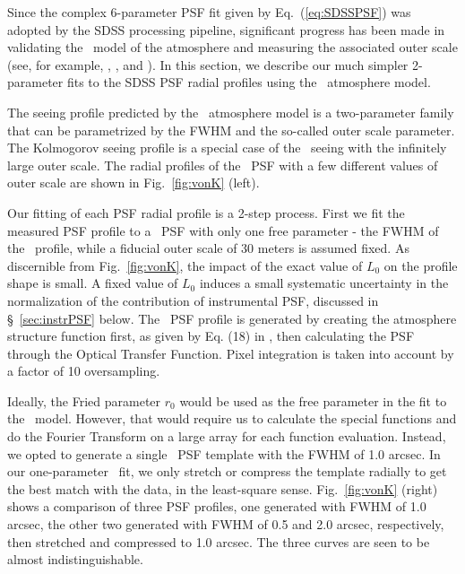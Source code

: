 

Since the complex 6-parameter PSF fit given by Eq.~(\ref{eq:SDSSPSF}) was adopted by 
the SDSS processing pipeline, significant progress has been made in validating the 
\vk~model of the atmosphere and measuring the associated outer
scale (see, for example, \citealt{Tokovinin2002}, \citealt{Boccas2004}, and \citealt{MartinezMessenger}).
In this section, we describe our much simpler 2-parameter fits to the SDSS PSF
radial profiles using the \vk~atmosphere model.

The seeing profile predicted by the \vk~atmosphere model is a two-parameter
family that can be parametrized by the FWHM and the so-called outer scale
parameter. The Kolmogorov seeing profile is a special case of the 
\vk~seeing with the infinitely large outer scale. The radial profiles of the 
\vk~PSF with a few different values of outer scale are shown in Fig.~\ref{fig:vonK} (left). 


Our fitting of each PSF radial profile is a 2-step process. First we fit the
measured PSF profile to a \vk~PSF with only one free parameter -
the FWHM of the \vk~profile, while a fiducial outer scale of 30 meters
is assumed fixed. As discernible from Fig.~\ref{fig:vonK}, the impact of the exact
value of $L_0$ on the profile shape is small. A fixed value of $L_0$ induces a small 
systematic uncertainty in the normalization of the contribution of instrumental PSF, 
discussed in \S~\ref{sec:instrPSF}  below. The \vk~PSF profile is generated by creating 
the atmosphere structure function first, as given by Eq. (18) in \cite{Tokovinin2002},
then calculating the PSF through the Optical Transfer Function. 
Pixel integration is taken into account by a factor of 10 oversampling.

Ideally, the Fried parameter $r_0$ would be used as the free
parameter in the fit to the \vk~model. However, 
that would require us to calculate the special functions and do the
Fourier Transform on a large array for each function evaluation.
Instead, we opted to generate a single \vk~PSF template with the FWHM of 
1.0 arcsec. In our one-parameter \vk~fit, we only stretch or compress
the template radially to get the best match with the data, in the
least-square sense.
Fig.~\ref{fig:vonK} (right) shows a comparison of three PSF profiles,
one generated with FWHM of 1.0 arcsec, the other two generated with
FWHM of 0.5 and 2.0 arcsec, respectively, then stretched and
compressed to 1.0 arcsec. The three curves are seen to be almost
indistinguishable.

